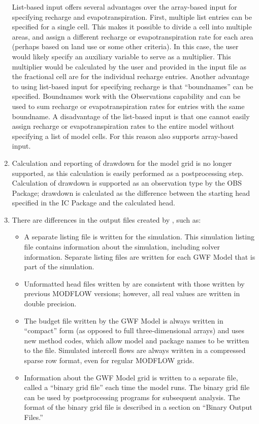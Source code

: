 \begin{enumerate}
List-based input offers several advantages over the array-based input for specifying recharge and evapotranspiration.  First, multiple list entries can be specified for a single cell.  This makes it possible to divide a cell into multiple areas, and assign a different recharge or evapotranspiration rate for each area (perhaps based on land use or some other criteria).  In this case, the user would likely specify an auxiliary variable to serve as a multiplier.  This multiplier would be calculated by the user and provided in the input file as the fractional cell are for the individual recharge entries.  Another advantage to using list-based input for specifying recharge is that ``boundnames'' can be specified.  Boundnames work with the Observations capability and can be used to sum recharge or evapotranspiration rates for entries with the same boundname.  A disadvantage of the list-based input is that one cannot easily assign recharge or evapotranspiration rates to the entire model without specifying a list of model cells.  For this reason \mf also supports array-based input.

\item Calculation and reporting of drawdown for the model grid is no longer supported, as this calculation is easily performed as a postprocessing step.  Calculation of drawdown is supported as an observation type by the OBS Package; 
drawdown is calculated as the difference between the starting head specified in the IC Package and the calculated head.

\item There are differences in the output files created by \mf, such as:
\begin{itemize}

\item A separate listing file is written for the simulation.  This simulation listing file contains information about the simulation, including solver information.  Separate listing files are written for each GWF Model that is part of the simulation.

\item Unformatted head files written by \mf are consistent with those written by previous MODFLOW versions; however, all real values are written in double precision.

\item The budget file written by the GWF Model is always written in ``compact'' form (as opposed to full three-dimensional arrays) and uses new method codes, which allow model and package names to be written to the file.  Simulated intercell flows are always written in a compressed sparse row format, even for regular MODFLOW grids.

\item Information about the GWF Model grid is written to a separate file, called a ``binary grid file'' each time the model runs.  The binary grid file can be used by postprocessing programs for subsequent analysis.  The format of the binary grid file is described in a section on ``Binary Output Files.''

\end{itemize}


\end{enumerate}
